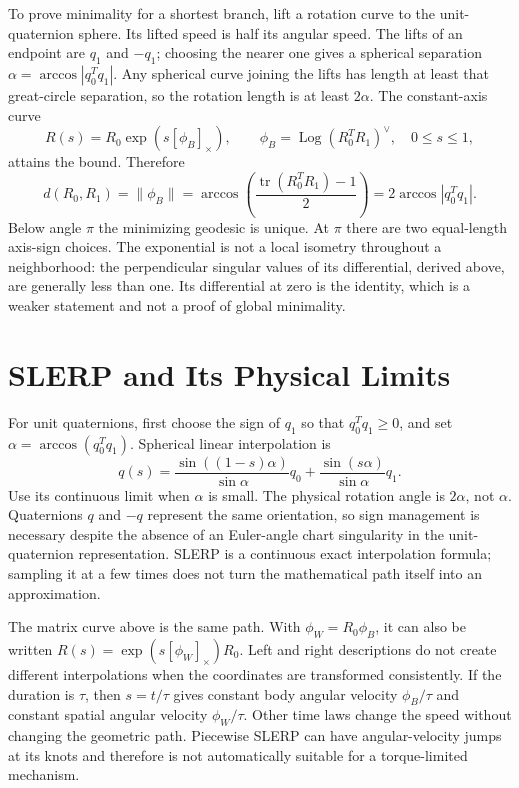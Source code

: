 To prove minimality for a shortest branch, lift a rotation curve to the unit-quaternion sphere. Its lifted speed is half its angular speed. The lifts of an endpoint are $q_1$ and $-q_1$; choosing the nearer one gives a spherical separation $\alpha=\arccos|q_0^Tq_1|$. Any spherical curve joining the lifts has length at least that great-circle separation, so the rotation length is at least $2\alpha$. The constant-axis curve
\begin{equation}
 R(s)=R_0\exp(s[\phi_B]_\times),\qquad
 \phi_B=\operatorname{Log}(R_0^TR_1)^\vee,\quad 0\leq s\leq1,
 \label{eq:geodesic_subgroup}
\end{equation}
attains the bound. Therefore
\begin{equation}
 d(R_0,R_1)=\|\phi_B\|
 =\arccos\left(\frac{\operatorname{tr}(R_0^TR_1)-1}{2}\right)
 =2\arccos|q_0^Tq_1|.
 \label{eq:geodesic_distance}
\end{equation}
Below angle $\pi$ the minimizing geodesic is unique. At $\pi$ there are two equal-length axis-sign choices. The exponential is not a local isometry throughout a neighborhood: the perpendicular singular values of its differential, derived above, are generally less than one. Its differential at zero is the identity, which is a weaker statement and not a proof of global minimality.

\section{SLERP and Its Physical Limits}
\label{sec:slerp}

For unit quaternions, first choose the sign of $q_1$ so that $q_0^Tq_1\geq0$, and set $\alpha=\arccos(q_0^Tq_1)$. Spherical linear interpolation is
\begin{equation}
 q(s)=\frac{\sin((1-s)\alpha)}{\sin\alpha}q_0
      +\frac{\sin(s\alpha)}{\sin\alpha}q_1.
 \label{eq:exponential_slerp}
\end{equation}
Use its continuous limit when $\alpha$ is small. The physical rotation angle is $2\alpha$, not $\alpha$. Quaternions $q$ and $-q$ represent the same orientation, so sign management is necessary despite the absence of an Euler-angle chart singularity in the unit-quaternion representation. SLERP is a continuous exact interpolation formula; sampling it at a few times does not turn the mathematical path itself into an approximation.

The matrix curve above is the same path. With $\phi_W=R_0\phi_B$, it can also be written $R(s)=\exp(s[\phi_W]_\times)R_0$. Left and right descriptions do not create different interpolations when the coordinates are transformed consistently. If the duration is $\tau$, then $s=t/\tau$ gives constant body angular velocity $\phi_B/\tau$ and constant spatial angular velocity $\phi_W/\tau$. Other time laws change the speed without changing the geometric path. Piecewise SLERP can have angular-velocity jumps at its knots and therefore is not automatically suitable for a torque-limited mechanism.

